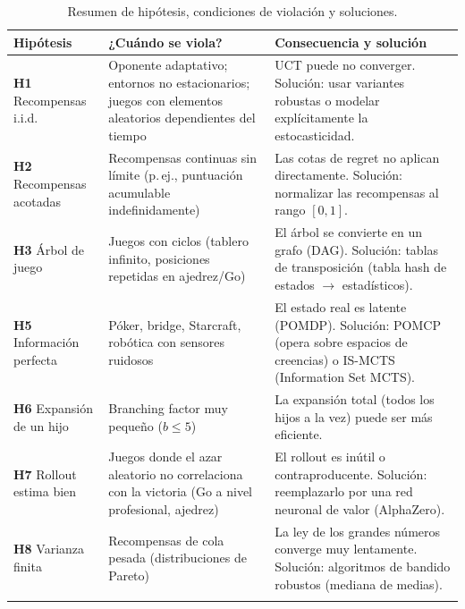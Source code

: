 \documentclass[12pt, a4paper]{article}
\begin{document}
\begin{longtable}{L{3cm} L{5cm} L{6cm}}
\toprule
\textbf{Hipótesis} & \textbf{¿Cuándo se viola?} & \textbf{Consecuencia y solución} \\
\midrule
\endhead
\textbf{H1} Recompensas i.i.d. &
  Oponente adaptativo; entornos no estacionarios; juegos con elementos
  aleatorios dependientes del tiempo &
  UCT puede no converger. Solución: usar variantes robustas o modelar
  explícitamente la estocasticidad. \\[6pt]

\textbf{H2} Recompensas acotadas &
  Recompensas continuas sin límite (p.\,ej., puntuación acumulable
  indefinidamente) &
  Las cotas de regret no aplican directamente. Solución: normalizar las
  recompensas al rango $[0,1]$. \\[6pt]

\textbf{H3} Árbol de juego &
  Juegos con ciclos (tablero infinito, posiciones repetidas en ajedrez/Go) &
  El árbol se convierte en un grafo (DAG). Solución: tablas de transposición
  (tabla hash de estados $\to$ estadísticos). \\[6pt]

\textbf{H5} Información perfecta &
  Póker, bridge, Starcraft, robótica con sensores ruidosos &
  El estado real es latente (POMDP). Solución: POMCP (opera sobre espacios
  de creencias) o IS-MCTS (Information Set MCTS). \\[6pt]

\textbf{H6} Expansión de un hijo &
  Branching factor muy pequeño ($b \leq 5$) &
  La expansión total (todos los hijos a la vez) puede ser más eficiente. \\[6pt]

\textbf{H7} Rollout estima bien &
  Juegos donde el azar aleatorio no correlaciona con la victoria
  (Go a nivel profesional, ajedrez) &
  El rollout es inútil o contraproducente. Solución: reemplazarlo por una
  red neuronal de valor (AlphaZero). \\[6pt]

\textbf{H8} Varianza finita &
  Recompensas de cola pesada (distribuciones de Pareto) &
  La ley de los grandes números converge muy lentamente. Solución:
  algoritmos de bandido robustos (mediana de medias). \\

\bottomrule
\caption{Resumen de hipótesis, condiciones de violación y soluciones.}
\end{longtable}

\end{document}
